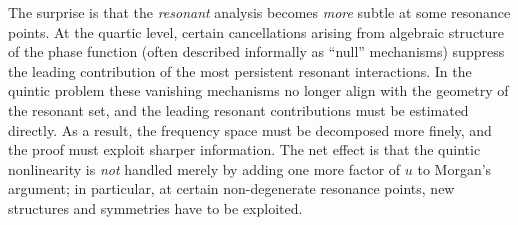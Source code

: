 \documentclass[reqno,english,11pt]{amsart}
\theoremstyle{definition}
\numberwithin{equation}{section}
\begin{document}
The surprise is that the \emph{resonant} analysis becomes \emph{more} subtle at  some resonance points.  At the quartic level, certain cancellations arising from algebraic structure of the phase function  (often described informally as ``null'' mechanisms) suppress the leading contribution of the most persistent resonant interactions.  In the quintic problem these vanishing mechanisms no longer align with the geometry of the resonant set, and the leading resonant contributions must be estimated directly.
As a result, the frequency space must be decomposed more finely, and the proof must exploit sharper information.
%
%
The net effect is that the quintic nonlinearity is \emph{not} handled merely by adding one more factor of $u$ to Morgan's argument;  in particular,  at certain non-degenerate resonance points, new structures and symmetries have to be exploited.
\end{document}
